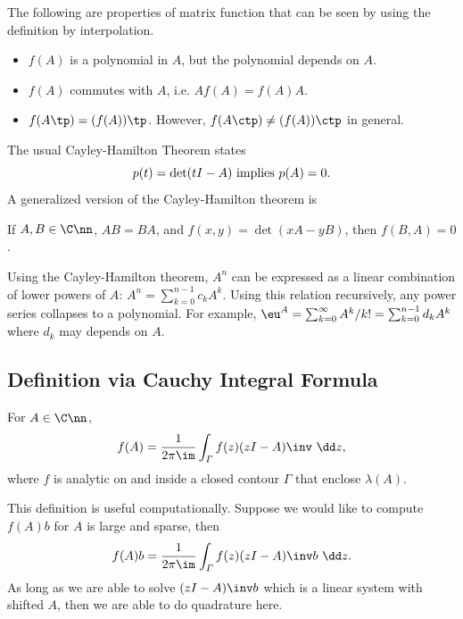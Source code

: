 \documentclass{article}
\def\vG{\varGamma}
\begin{document}
The following are properties of matrix function that can be seen by
using the definition by interpolation.
\begin{itemize}
    \item $f(A)$ is a polynomial in $A$, but the polynomial depends on
    $A$.
    \item $f(A)$ commutes with $A$, i.e. $Af(A) = f(A) A$.
    \item $f(A\tp) = (f(A))\tp$. However, $f(A\ctp) \neq (f(A))\ctp$ in
    general.
\end{itemize}

The usual Cayley-Hamilton Theorem states
\begin{equation}\notag
    p(t) = \det(tI - A) \text{ implies } p(A) = 0.
\end{equation}
A generalized version of the Cayley-Hamilton theorem is
\begin{theorem}
    [Cayley, 1857] If $A, B \in \C\nn$, $AB = BA$, and $f(x,y) = \det
    (xA - yB)$, then $f(B,A) = 0$.
\end{theorem}

Using the Cayley-Hamilton theorem, $A^n$ can be expressed as a linear
combination of lower powers of $A$: $A^n = \sum_{k = 0}^{n-1}c_kA^k$.
Using this relation recursively, any power series collapses to a
polynomial. For example, $\eu^A = \sum_{k = 0}^\infty A^k/k! =
\sum_{k=0}^{n-1}d_kA^k$ where $d_k$ may depends on $A$.

\subsection{Definition via Cauchy Integral Formula}

\begin{definition}
     For $A\in\C\nn$, 
    \begin{equation}\notag
        f(A) = \frac{1}{2\pi \im}\int_\vG f(z)(zI - A)\inv ~\dd z,
    \end{equation}
    where $f$ is analytic on and inside a closed contour $\vG$ that
    enclose $\lambda(A)$.
\end{definition}

This definition is useful computationally. Suppose we would like to
compute $f(A)b$ for $A$ is large and sparse, then 
\begin{equation}\notag
    f(A)b = \frac{1}{2\pi\im}\int_{\vG} f(z)(zI - A)\inv b~\dd z.
\end{equation}
As long as we are able to solve $(zI - A)\inv b$ which is a linear
system with shifted $A$, then we are able to do quadrature here.
\end{document}
